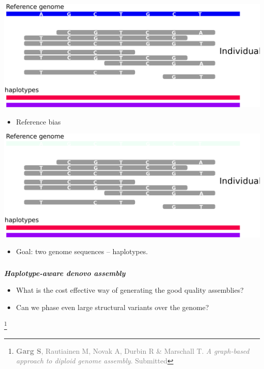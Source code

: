 \documentclass[notes=hide]{beamer}
\newcommand{\captionslide}[1]{
\begin{frame}
\frametitle{\phantom{NONE}}
\begin{center}
\vspace{1cm}
\usebeamerfont{Largefont}
          {\bf\em #1}
          \vspace{2cm}
\end{center}
\end{frame}
}
\begin{document}

\begin{frame}{}
\begin{center}
\includegraphics[scale=.35]{figs/sih-phasing-complete-assembly.pdf}
\end{center}
\begin{itemize}
 \item Reference bias
\end{itemize}

\end{frame}

\begin{frame}{}
\begin{center}
\includegraphics[scale=.35]{figs/sih-phasing-complete-assembly1.pdf}
\end{center}
\begin{itemize}
 \item Goal: two genome sequences -- haplotypes.
\end{itemize}
\end{frame}

\captionslide{Haplotype-aware denovo assembly \\
 {\begin{itemize}
 \scriptsize \color{red}
		\item What is the cost effective way of generating the good quality assemblies?
		\item Can we phase even large structural variants over the genome?
	\end{itemize} }
\let\thefootnote\relax\footnote{\scriptsize\textcolor{gray}{\textbf{Garg S}, Rautiainen M, Novak A, Durbin R \& Marschall T. \textit{A graph-based approach to diploid genome assembly}. Submitted}}
}
\end{document}

